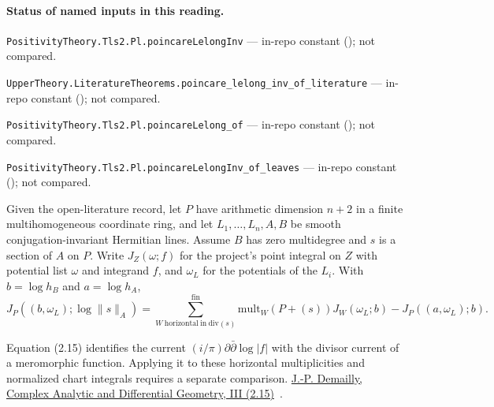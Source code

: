 

\paragraph{Status of named inputs in this reading.}
\noindent\nolinkurl{PositivityTheory.Tls2.Pl.poincareLelongInv} --- in-repo constant (); not compared.\par
\noindent\nolinkurl{UpperTheory.LiteratureTheorems.poincare_lelong_inv_of_literature} --- in-repo constant (); not compared.\par
\noindent\nolinkurl{PositivityTheory.Tls2.Pl.poincareLelong_of} --- in-repo constant (); not compared.\par
\noindent\nolinkurl{PositivityTheory.Tls2.Pl.poincareLelongInv_of_leaves} --- in-repo constant (); not compared.\par

\begin{formalstatement}\label{sub:T21}

Given the open-literature record, let $P$ have arithmetic dimension $n+2$
in a finite multihomogeneous coordinate ring, and let
$L_1,\ldots,L_n,A,B$ be smooth conjugation-invariant Hermitian lines.
Assume $B$ has zero multidegree and $s$ is a section of $A$ on $P$.
Write $J_Z(\omega;f)$ for the project's point integral on $Z$ with
potential list $\omega$ and integrand $f$, and $\omega_L$ for the
potentials of the $L_i$. With $b=\log h_B$ and $a=\log h_A$,
\[
 J_P((b,\omega_L);\log\|s\|_A)=
   \sum_{W\ \mathrm{horizontal~in~div}(s)}^{\mathrm{fin}}
       \mathrm{mult}_{W}(P+(s))J_W(\omega_L;b)
     -J_P((a,\omega_L);b).
\]

\end{formalstatement}

\noindent Equation (2.15) identifies the current $(i/\pi)\partial\bar\partial\log|f|$ with the divisor current of a meromorphic function. Applying it to these horizontal multiplicities and normalized chart integrals requires a separate comparison. \href{https://www-fourier.univ-grenoble-alpes.fr/~demailly/manuscripts/agbook.pdf}{J.-P. Demailly, Complex Analytic and Differential Geometry, III (2.15)}~\cite{r21-demailly}.
